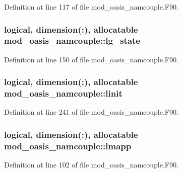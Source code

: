 Definition at line 117 of file mod\+\_\+oasis\+\_\+namcouple.\+F90.

\hypertarget{classmod__oasis__namcouple_ac1be1629c1369b96a4ff08c07200a05d}{
\subsubsection[{lg\+\_\+state}]{\setlength{\rightskip}{0pt plus 5cm}logical, dimension(\+:), allocatable mod\+\_\+oasis\+\_\+namcouple\+::lg\+\_\+state\hspace{0.3cm}{\ttfamily [private]}}}\label{classmod__oasis__namcouple_ac1be1629c1369b96a4ff08c07200a05d}


Definition at line 150 of file mod\+\_\+oasis\+\_\+namcouple.\+F90.

\hypertarget{classmod__oasis__namcouple_ac124af3aecadc7ba436f2ee6caffee9a}{
\subsubsection[{linit}]{\setlength{\rightskip}{0pt plus 5cm}logical, dimension(\+:), allocatable mod\+\_\+oasis\+\_\+namcouple\+::linit\hspace{0.3cm}{\ttfamily [private]}}}\label{classmod__oasis__namcouple_ac124af3aecadc7ba436f2ee6caffee9a}


Definition at line 241 of file mod\+\_\+oasis\+\_\+namcouple.\+F90.

\hypertarget{classmod__oasis__namcouple_a8eca7c715a39c523e00ed2be0612950d}{
\subsubsection[{lmapp}]{\setlength{\rightskip}{0pt plus 5cm}logical, dimension(\+:), allocatable mod\+\_\+oasis\+\_\+namcouple\+::lmapp\hspace{0.3cm}{\ttfamily [private]}}}\label{classmod__oasis__namcouple_a8eca7c715a39c523e00ed2be0612950d}


Definition at line 102 of file mod\+\_\+oasis\+\_\+namcouple.\+F90.

